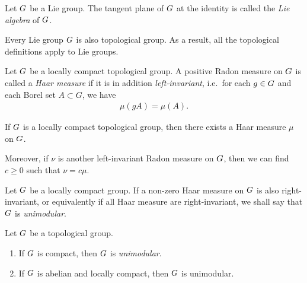 \begin{definition}
\label{definition:Lie_algebra}
    Let $G$ be a Lie group.
    The tangent plane of $G$ at the identity is called
    the \emph{Lie algebra} of $G$.
\end{definition}

\begin{remark}
    Every Lie group $G$ is also topological group.
    As a result, all the topological definitions apply to Lie groups.
\end{remark}

\begin{definition}
    Let $G$ be a locally compact topological group.
    A positive Radon measure on $G$ is called a \emph{Haar measure}
    if it is in addition \emph{left-invariant},
    i.e.\ for each $g \in G$ and each Borel set $A \subset G$, we have
    \begin{align*}
        \mu(g A) = \mu(A).
    \end{align*}
\end{definition}

\begin{proposition}
    If $G$ is a locally compact topological group,
    then there exists a Haar measure $\mu$ on $G$.

    Moreover, if $\nu$ is another left-invariant Radon measure on $G$,
    then we can find $c \geq 0$ such that $\nu = c \mu$.
\end{proposition}

\begin{definition}
\label{definition:unimodular_group}
    Let $G$ be a locally compact group.
    If a non-zero Haar measure on $G$ is also right-invariant,
    or equivalently if all Haar measure are right-invariant,
    we shall say that $G$ is \emph{unimodular}.
\end{definition}

\begin{proposition}
\label{proposition:sufficient_conditions_to_be_unimodular}
    Let $G$ be a topological group.
    \begin{enumerate}
        \item If $G$ is compact, then $G$ is \emph{unimodular}.
        \item If $G$ is abelian and locally compact, then $G$ is unimodular.
    \end{enumerate}
\end{proposition}

